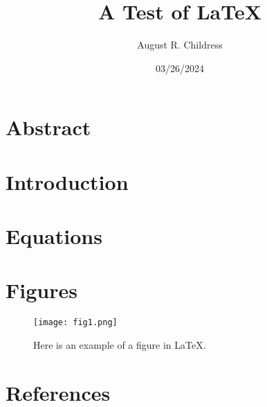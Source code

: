 \documentclass{article}
\author{August R. Childress}
\title{A Test of LaTeX}
\date{03/26/2024}
\begin{document}
\maketitle

\section{Abstract}


\section{Introduction}


\section{Equations}



\section{Figures}

\begin{figure} [h!]
\begin{center}
\texttt{[image: fig1.png]}
\end{center}
\label{fig1}
\caption{Here is an example of a figure in LaTeX.}

\end{figure}

\section{References}


\end{document}
